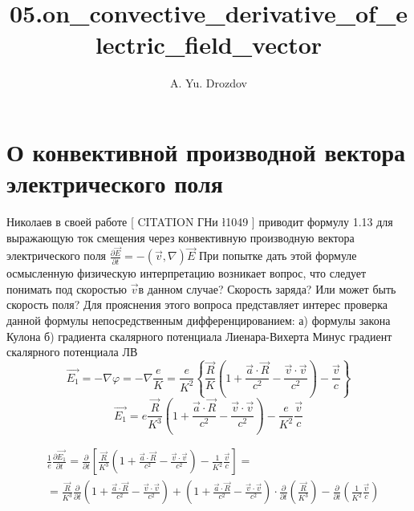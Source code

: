 \documentclass[11pt]{article}
\author{A. Yu. Drozdov}
\title{05.on\_convective\_derivative\_of\_electric\_field\_vector}
\begin{document}
    
    \maketitle
    
    

    
    \section{О конвективной производной вектора электрического
поля}\label{ux43e-ux43aux43eux43dux432ux435ux43aux442ux438ux432ux43dux43eux439-ux43fux440ux43eux438ux437ux432ux43eux434ux43dux43eux439-ux432ux435ux43aux442ux43eux440ux430-ux44dux43bux435ux43aux442ux440ux438ux447ux435ux441ux43aux43eux433ux43e-ux43fux43eux43bux44f}

Николаев в своей работе {[} CITATION ГНи \l 1049 {]} приводит формулу
1.13 для выражающую ток смещения через конвективную производную вектора
электрического поля
\(\frac{\partial \overrightarrow{E}}{\partial t}=-\left( \overrightarrow{v},\nabla \right)\overrightarrow{E}\)
При попытке дать этой формуле осмысленную физическую интерпретацию
возникает вопрос, что следует понимать под скоростью
\(\overrightarrow{v}\)в данном случае? Скорость заряда? Или может быть
скорость поля? Для прояснения этого вопроса представляет интерес
проверка данной формулы непосредственным дифференцированием: а) формулы
закона Кулона б) градиента скалярного потенциала Лиенара-Вихерта Минус
градиент скалярного потенциала ЛВ
\[\overrightarrow{{{E}_{1}}}=-\nabla \varphi =-\nabla \frac{e}{K}=\frac{e}{{{K}^{2}}}\left\{ \frac{\overrightarrow{R}}{K}\left( 1+\frac{\overrightarrow{a}\cdot \overrightarrow{R}}{{{c}^{2}}}-\frac{\overrightarrow{v}\cdot \overrightarrow{v}}{{{c}^{2}}} \right)-\frac{\overrightarrow{v}}{c} \right\}\]
\[\overrightarrow{{{E}_{1}}}=e\frac{\overrightarrow{R}}{{{K}^{3}}}\left( 1+\frac{\overrightarrow{a}\cdot \overrightarrow{R}}{{{c}^{2}}}-\frac{\overrightarrow{v}\cdot \overrightarrow{v}}{{{c}^{2}}} \right)-\frac{e}{{{K}^{2}}}\frac{\overrightarrow{v}}{c}\]

\[\begin{align}
  & \frac{1}{e}\frac{\partial \overrightarrow{{{E}_{1}}}}{\partial t}=\frac{\partial }{\partial t}\left[ \frac{\overrightarrow{R}}{{{K}^{3}}}\left( 1+\frac{\overrightarrow{a}\cdot \overrightarrow{R}}{{{c}^{2}}}-\frac{\overrightarrow{v}\cdot \overrightarrow{v}}{{{c}^{2}}} \right)-\frac{1}{{{K}^{2}}}\frac{\overrightarrow{v}}{c} \right]= \\ 
 & =\frac{\overrightarrow{R}}{{{K}^{3}}}\frac{\partial }{\partial t}\left( 1+\frac{\overrightarrow{a}\cdot \overrightarrow{R}}{{{c}^{2}}}-\frac{\overrightarrow{v}\cdot \overrightarrow{v}}{{{c}^{2}}} \right)+\left( 1+\frac{\overrightarrow{a}\cdot \overrightarrow{R}}{{{c}^{2}}}-\frac{\overrightarrow{v}\cdot \overrightarrow{v}}{{{c}^{2}}} \right)\cdot \frac{\partial }{\partial t}\left( \frac{\overrightarrow{R}}{{{K}^{3}}} \right)-\frac{\partial }{\partial t}\left( \frac{1}{{{K}^{2}}}\frac{\overrightarrow{v}}{c} \right) \\ 
\end{align}\]
\end{document}

